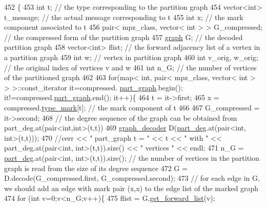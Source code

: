 \begin{DoxyCode}
452 \{
453   \textcolor{keywordtype}{int} t; \textcolor{comment}{// the type corresponding to the partition graph}
454   vector<int> t\_message; \textcolor{comment}{// the actual message corresponding to t}
455   \textcolor{keywordtype}{int} x; \textcolor{comment}{// the mark component associated to t}
456   pair< mpz\_class, vector< int > > G\_compressed; \textcolor{comment}{// the compressed form of the partition graph}
457   \hyperlink{classgraph}{graph} G; \textcolor{comment}{// the decoded partition graph}
458   vector<int> flist; \textcolor{comment}{// the forward adjacency list of a vertex in a partition graph}
459   \textcolor{keywordtype}{int} w; \textcolor{comment}{// vertex in partition graph}
460   \textcolor{keywordtype}{int} v\_orig, w\_orig; \textcolor{comment}{// the original index of vertices v and w}
461   \textcolor{keywordtype}{int} n\_G; \textcolor{comment}{// the number of vertices of the partitioned graph }
462 
463   \textcolor{keywordflow}{for}(map< \textcolor{keywordtype}{int}, pair< mpz\_class, vector< int > > >::const\_iterator it=compressed.
      \hyperlink{classmarked__graph__compressed_ae179a4737e6eab905c18a94d44ef64b7}{part\_graph}.begin(); it!=compressed.\hyperlink{classmarked__graph__compressed_ae179a4737e6eab905c18a94d44ef64b7}{part\_graph}.end(); it++)\{
464     t = it->first;
465     x = compressed.\hyperlink{classmarked__graph__compressed_a86b00223525703e973415cbc9c94da68}{type\_mark}[t]; \textcolor{comment}{// the mark component of t }
466 
467     G\_compressed = it->second;
468     \textcolor{comment}{// the degree sequence of the graph can be obtained from part\_deg.at(pair<int,int>(t,t))}
469     \hyperlink{classgraph__decoder}{graph\_decoder} D(\hyperlink{classmarked__graph__decoder_a6882e96fcad9abb10e72f1398814824a}{part\_deg}.at(pair<int, int>(t,t)));
470     \textcolor{comment}{//cerr << " part\_graph t = " << t << " with " << part\_deg.at(pair<int, int>(t,t)).size() << " vertices
       " << endl;}
471     n\_G = \hyperlink{classmarked__graph__decoder_a6882e96fcad9abb10e72f1398814824a}{part\_deg}.at(pair<int, int>(t,t)).size(); \textcolor{comment}{// the number of vertices in the partition graph
       is read from the size of its degree sequence}
472     G = D.decode(G\_compressed.first, G\_compressed.second);
473     \textcolor{comment}{// for each edge in G, we should add an edge with mark pair (x,x) to the edge list of the marked graph}
474     \textcolor{keywordflow}{for} (\textcolor{keywordtype}{int} v=0;v<n\_G;v++)\{
475       flist = G.\hyperlink{classgraph_aa8fbee52a7b3604dbbd9175040c7ead5}{get\_forward\_list}(v);

\end{DoxyCode}
